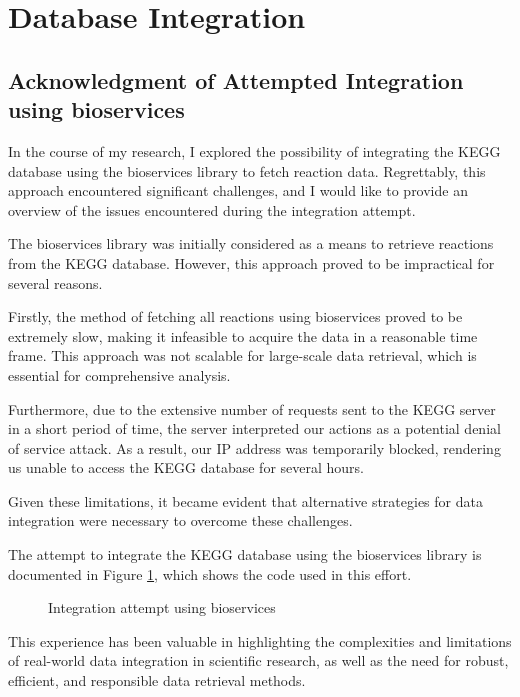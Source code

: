 \section{Database Integration}

\subsection{Acknowledgment of Attempted Integration using bioservices}

In the course of my research, I explored the possibility of integrating the KEGG database using the bioservices library to fetch reaction data. Regrettably, this approach encountered significant challenges, and I would like to provide an overview of the issues encountered during the integration attempt.

The bioservices library was initially considered as a means to retrieve reactions from the KEGG database. However, this approach proved to be impractical for several reasons. 

Firstly, the method of fetching all reactions using bioservices proved to be extremely slow, making it infeasible to acquire the data in a reasonable time frame. This approach was not scalable for large-scale data retrieval, which is essential for comprehensive analysis.

Furthermore, due to the extensive number of requests sent to the KEGG server in a short period of time, the server interpreted our actions as a potential denial of service attack. As a result, our IP address was temporarily blocked, rendering us unable to access the KEGG database for several hours. 

Given these limitations, it became evident that alternative strategies for data integration were necessary to overcome these challenges. 

The attempt to integrate the KEGG database using the bioservices library is documented in Figure \ref{fig:bioservices}, which shows the code used in this effort.

\begin{figure}[H]
    \centering
    
    \caption{Integration attempt using bioservices}
    \label{fig:bioservices}
\end{figure}

This experience has been valuable in highlighting the complexities and limitations of real-world data integration in scientific research, as well as the need for robust, efficient, and responsible data retrieval methods.



